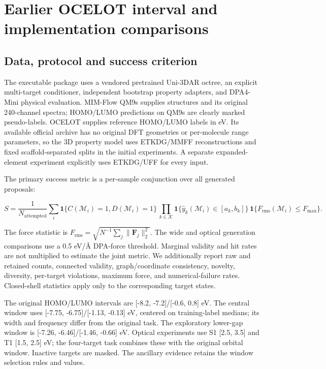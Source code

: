 \documentclass[11pt,a4paper]{article}
\begin{document}
\section{Earlier OCELOT interval and implementation
comparisons}\label{earlier-ocelot-interval-and-implementation-comparisons}

\FloatBarrier
\subsection{Data, protocol and success
criterion}\label{data-protocol-and-success-criterion}

The executable package uses a vendored pretrained Uni-3DAR octree, an
explicit multi-target conditioner, independent bootstrap property
adapters, and DPA4-Mini physical evaluation. MIM-Flow QM9s
\citep{cheng2026mimdata} supplies structures and its original
240-channel spectra; HOMO/LUMO predictions on QM9s are clearly marked
pseudo-labels. OCELOT \citep{bhat2023ocelot} supplies reference
HOMO/LUMO labels in eV. Its available official archive has no original
DFT geometries or per-molecule range parameters, so the 3D property
model uses ETKDG/MMFF reconstructions and fixed scaffold-separated
splits in the initial experiments. A separate expanded-element
experiment explicitly uses ETKDG/UFF for every input.

The primary success metric is a per-sample conjunction over all
generated proposals:

\[
S=\frac1{N_{\mathrm{attempted}}}\sum_i
\mathbf1\{C(\mathcal M_i)=1, D(\mathcal M_i)=1\}\,
\prod_{k\in\mathcal K}\mathbf1\{\hat y_k(\mathcal M_i)\in[a_k,b_k]\}\,
\mathbf1\{F_{\mathrm{rms}}(\mathcal M_i)\leq F_{\max}\}.
\]

The force statistic is
\(F_{\mathrm{rms}}=\sqrt{N^{-1}\sum_j\|\mathbf F_j\|_2^2}\). The wide
and optical generation comparisons use a 0.5 eV/Å DPA-force threshold.
Marginal validity and hit rates are not multiplied to estimate the joint
metric. We additionally report raw and retained counts, connected
validity, graph/coordinate consistency, novelty, diversity, per-target
violations, maximum force, and numerical-failure rates. Closed-shell
statistics apply only to the corresponding target states.

The original HOMO/LUMO intervals are {[}-8.2, -7.2{]}/{[}-0.6, 0.8{]}
eV. The central window uses {[}-7.75, -6.75{]}/{[}-1.13, -0.13{]} eV,
centered on training-label medians; its width and frequency differ from
the original task. The exploratory lower-gap window is {[}-7.26,
-6.46{]}/{[}-1.46, -0.66{]} eV. Optical experiments use S1 {[}2.5,
3.5{]} and T1 {[}1.5, 2.5{]} eV; the four-target task combines these
with the original orbital window. Inactive targets are masked. The
ancillary evidence retains the window selection rules and values.
\end{document}
